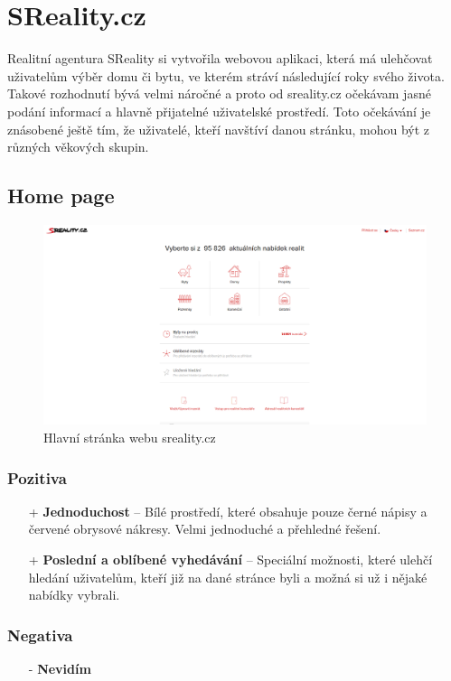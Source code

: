 \section{SReality.cz}
\label{chap:sreality}
Realitní agentura SReality si vytvořila webovou aplikaci, která má ulehčovat uživatelům výběr domu či bytu, ve kterém stráví následující roky svého života. Takové rozhodnutí bývá velmi náročné a proto od sreality.cz očekávam jasné podání informací a hlavně přijatelné uživatelské prostředí. Toto očekávání je znásobené ještě tím, že uživatelé, kteří navštíví danou stránku, mohou být z různých věkových skupin.\\

\subsection{Home page}
\begin{figure}[h]
    \centering
    \includegraphics[width=1.0\textwidth]{media/sreality/homepage.png}
    \caption{Hlavní stránka webu sreality.cz}
    \label{fig:sreality:homepage}
\end{figure}
\subsubsection*{Pozitiva}
\begin{itemize}
    \item[+] \textbf{Jednoduchost} -- Bílé prostředí, které obsahuje pouze černé nápisy a červené obrysové nákresy. Velmi jednoduché a přehledné řešení.
    \item[+] \textbf{Poslední a oblíbené vyhedávání} -- Speciální možnosti, které ulehčí hledání uživatelům, kteří již na dané stránce byli a možná si už i nějaké nabídky vybrali.
\end{itemize}
\subsubsection*{Negativa}
\begin{itemize}
    \item[-] \textbf{Nevidím}
\end{itemize}


